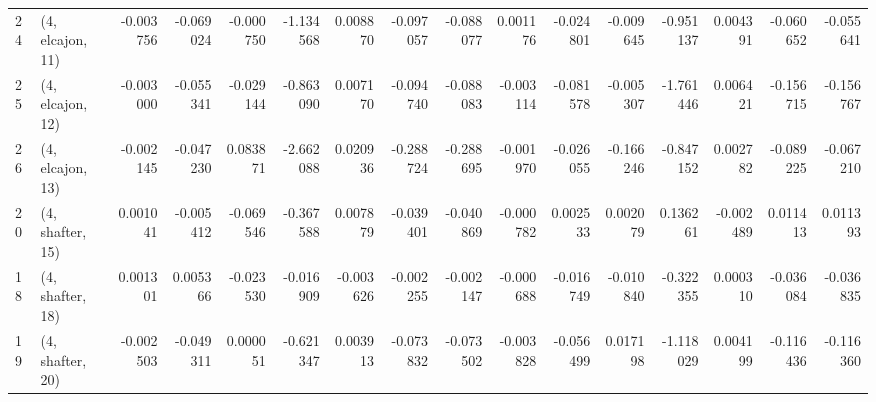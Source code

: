 \begin{tabular}{llrrrrrrrrrrrrrr}
24 &  (4, elcajon, 11) &  -0.003756 & -0.069024 & -0.000750 &  -1.134568 &  0.008870 &  -0.097057 & -0.088077 &  0.001176 & -0.024801 & -0.009645 &  -0.951137 &  0.004391 & -0.060652 & -0.055641 \\
25 &  (4, elcajon, 12) &  -0.003000 & -0.055341 & -0.029144 &  -0.863090 &  0.007170 &  -0.094740 & -0.088083 & -0.003114 & -0.081578 & -0.005307 &  -1.761446 &  0.006421 & -0.156715 & -0.156767 \\
26 &  (4, elcajon, 13) &  -0.002145 & -0.047230 &  0.083871 &  -2.662088 &  0.020936 &  -0.288724 & -0.288695 & -0.001970 & -0.026055 & -0.166246 &  -0.847152 &  0.002782 & -0.089225 & -0.067210 \\
20 &  (4, shafter, 15) &   0.001041 & -0.005412 & -0.069546 &  -0.367588 &  0.007879 &  -0.039401 & -0.040869 & -0.000782 &  0.002533 &  0.002079 &   0.136261 & -0.002489 &  0.011413 &  0.011393 \\
18 &  (4, shafter, 18) &   0.001301 &  0.005366 & -0.023530 &  -0.016909 & -0.003626 &  -0.002255 & -0.002147 & -0.000688 & -0.016749 & -0.010840 &  -0.322355 &  0.000310 & -0.036084 & -0.036835 \\
19 &  (4, shafter, 20) &  -0.002503 & -0.049311 &  0.000051 &  -0.621347 &  0.003913 &  -0.073832 & -0.073502 & -0.003828 & -0.056499 &  0.017198 &  -1.118029 &  0.004199 & -0.116436 & -0.116360 \\
\bottomrule
\end{tabular}
